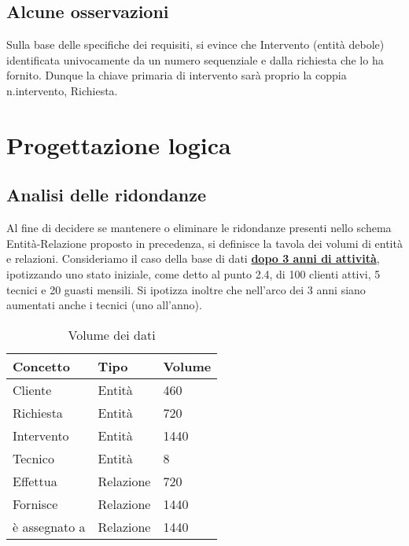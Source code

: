 \documentclass{article}
\begin{document}
\subsection{Alcune osservazioni}
Sulla base delle specifiche dei requisiti, si evince che Intervento (entità debole) identificata univocamente da un numero sequenziale e dalla richiesta che lo ha fornito. Dunque la chiave primaria di intervento sarà proprio la coppia n.intervento, Richiesta.


\section{Progettazione logica}

\subsection{Analisi delle ridondanze}
Al fine di decidere se mantenere o eliminare le ridondanze presenti nello schema Entità-Relazione proposto in precedenza, si definisce la tavola dei volumi di entità e relazioni.
Consideriamo il caso della base di dati \underline{\textbf{dopo 3 anni di attività}}, ipotizzando uno stato iniziale, come detto al punto 2.4, di 100 clienti attivi, 5 tecnici e 20 guasti mensili. Si ipotizza inoltre che nell'arco dei 3 anni siano aumentati anche i tecnici (uno all'anno). 

\begin{table}[h]
    \centering
    \begin{adjustbox}{width=1\textwidth}
        \begin{tabular}{|m{5cm}|m{5cm}|m{3cm}|}
            \hline  
            \textbf{Concetto} & \textbf{Tipo} & \textbf{Volume} \\ 
            \hline
            Cliente & Entità & 460 \\ 
            \hline
            Richiesta & Entità & 720 \\
            \hline
            Intervento & Entità & 1440 \\
            \hline
            Tecnico & Entità & 8 \\
            \hline
            Effettua & Relazione & 720 \\
            \hline
            Fornisce & Relazione & 1440\\
            \hline
            è assegnato a & Relazione & 1440 \\
            \hline
        \end{tabular}
    \end{adjustbox}
    \caption{Volume dei dati}
    \label{tab:volumedati}
\end{table}
\end{document}
